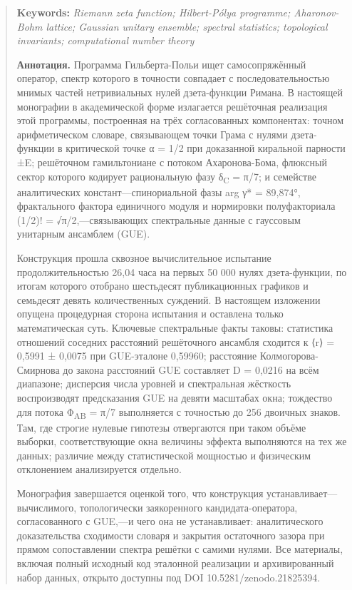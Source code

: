 \documentclass[10pt]{article}
\begin{document}
\begin{abstract}
\smallskip\noindent\textbf{Keywords:} \emph{Riemann zeta function; Hilbert-Pólya programme; Aharonov-Bohm lattice; Gaussian unitary ensemble; spectral statistics; topological invariants; computational number theory}

\noindent\textbf{Аннотация.} Программа Гильберта-Польи ищет самосопряжённый оператор, спектр которого в точности совпадает с последовательностью мнимых частей нетривиальных нулей дзета-функции Римана. В настоящей монографии в академической форме излагается решёточная реализация этой программы, построенная на трёх согласованных компонентах: точном арифметическом словаре, связывающем точки Грама с нулями дзета-функции в критической точке α = 1/2 при доказанной киральной парности ±E; решёточном гамильтониане с потоком Ахаронова-Бома, флюксный сектор которого кодирует рациональную фазу δ\textsubscript{C} = π/7; и семействе аналитических констант---спинориальной фазы arg γ* = 89,874°, фрактального фактора единичного модуля и нормировки полуфакториала (1/2)! = √π/2,---связывающих спектральные данные с гауссовым унитарным ансамблем (GUE).

Конструкция прошла сквозное вычислительное испытание продолжительностью 26,04 часа на первых 50 000 нулях дзета-функции, по итогам которого отобрано шестьдесят публикационных графиков и семьдесят девять количественных суждений. В настоящем изложении опущена процедурная сторона испытания и оставлена только математическая суть. Ключевые спектральные факты таковы: статистика отношений соседних расстояний решёточного ансамбля сходится к ⟨r⟩ = 0,5991 ± 0,0075 при GUE-эталоне 0,59960; расстояние Колмогорова-Смирнова до закона расстояний GUE составляет D = 0,0216 на всём диапазоне; дисперсия числа уровней и спектральная жёсткость воспроизводят предсказания GUE на девяти масштабах окна; тождество для потока Φ\textsubscript{AB} = π/7 выполняется с точностью до 256 двоичных знаков. Там, где строгие нулевые гипотезы отвергаются при таком объёме выборки, соответствующие окна величины эффекта выполняются на тех же данных; различие между статистической мощностью и физическим отклонением анализируется отдельно.

Монография завершается оценкой того, что конструкция устанавливает---вычислимого, топологически заякоренного кандидата-оператора, согласованного с GUE,---и чего она не устанавливает: аналитического доказательства сходимости словаря и закрытия остаточного зазора при прямом сопоставлении спектра решётки с самими нулями. Все материалы, включая полный исходный код эталонной реализации и архивированный набор данных, открыто доступны под DOI 10.5281/zenodo.21825394.


\end{abstract}
\end{document}
